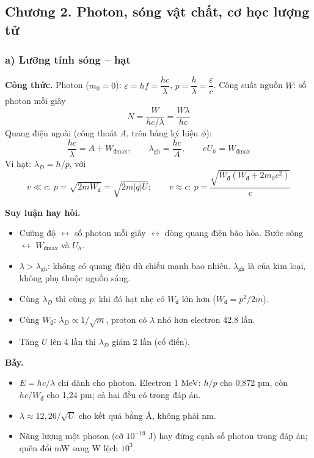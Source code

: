 \documentclass[11pt,a4paper]{article}
\newcommand{\Wd}{W_{\text{đ}}}
\begin{document}
\subsection*{Chương 2. Photon, sóng vật chất, cơ học lượng tử}

\subsubsection*{a) Lưỡng tính sóng -- hạt}

\textbf{Công thức.}
Photon ($m_0=0$): $\varepsilon=hf=\dfrac{hc}{\lambda}$, $p=\dfrac h\lambda=\dfrac\varepsilon c$. Công suất nguồn $W$: số photon mỗi giây
\begin{equation*}
    N=\frac{W}{hc/\lambda}=\frac{W\lambda}{hc}
\end{equation*}
Quang điện ngoài (công thoát $A$, trên bảng ký hiệu $\phi$):
\begin{equation*}
    \frac{hc}{\lambda}=A+W_{\text{đ}\max},\qquad \lambda_{\text{gh}}=\frac{hc}{A},\qquad eU_h=W_{\text{đ}\max}
\end{equation*}
Vi hạt: $\lambda_D=h/p$, với
\begin{equation*}
    v\ll c:\ p=\sqrt{2m\Wd}=\sqrt{2m|q|U};\qquad v\approx c:\ p=\frac{\sqrt{\Wd(\Wd+2m_0c^2)}}{c}
\end{equation*}

\textbf{Suy luận hay hỏi.}
\begin{itemize}
    \item Cường độ $\leftrightarrow$ số photon mỗi giây $\leftrightarrow$ dòng quang điện bão hòa. Bước sóng $\leftrightarrow$ $W_{\text{đ}\max}$ và $U_h$.
    \item $\lambda>\lambda_{\text{gh}}$: không có quang điện dù chiếu mạnh bao nhiêu. $\lambda_{\text{gh}}$ là của kim loại, không phụ thuộc nguồn sáng.
    \item Cùng $\lambda_D$ thì cùng $p$; khi đó hạt nhẹ có $\Wd$ lớn hơn ($\Wd=p^2/2m$).
    \item Cùng $\Wd$: $\lambda_D\propto1/\sqrt m$, proton có $\lambda$ nhỏ hơn electron 42,8 lần.
    \item Tăng $U$ lên 4 lần thì $\lambda_D$ giảm 2 lần (cổ điển).
\end{itemize}

\textbf{Bẫy.}
\begin{itemize}
    \item $E=hc/\lambda$ chỉ dành cho photon. Electron 1 MeV: $h/p$ cho 0,872 pm, còn $hc/\Wd$ cho 1,24 pm; cả hai đều có trong đáp án.
    \item $\lambda\approx12{,}26/\sqrt U$ cho kết quả bằng Å, không phải nm.
    \item Năng lượng một photon (cỡ $10^{-19}$ J) hay đứng cạnh số photon trong đáp án; quên đổi mW sang W lệch $10^3$.
\end{itemize}
\end{document}
